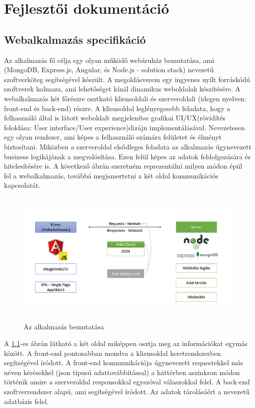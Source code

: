 \chapter{Fejlesztői dokumentáció} %
\label{ch:impl}

\section{Webalkalmazás specifikáció}
Az alkalmazás fő célja egy olyan működő webáruház bemutatása, ami \citeauthor{MEAN} (MongoDB, Express.js, Angular, és Node.js - solution stack) nevezetű szoftverköteg segítségével készült. A \citeauthor{MEAN}  megoldásverem egy ingyenes nyílt forráskódú szoftverek halmaza, ami lehetőséget kínál dinamikus weboldalak készítésére. A webalkalmazás két főrészre osztható kliensoldali és szerveroldali (idegen nyelven: front-end és back-end) részre. A kliensoldal leglényegesebb feladata, hogy a felhasználó által is látott weboldalt megjelenítse grafikai UI/UX(rövidítés feloldása: User interface/User experience)dizájn implementálásával. Nevezetesen egy olyan rendszer, ami képes a felhasználó számára felületet és élményt biztosítani. Miközben a szerveroldal elsődleges feladata az alkalmazás úgynevezett business logikájának a megvalósítása. Ezen felül képes az adatok feldolgozására és hitelesítésére is. A következő ábrán szeretném reprezentálni milyen módon épül fel a webalkalmazás, továbbá megismertetni a két oldal kommunikációs kapcsolatát.

\begin{figure}[H]
	\centering
	\includegraphics[width=1.0\textwidth,height=250px]{images/alkalmazas_bemutatasa.png}
	\caption{Az alkalmazás bemutatása}
	\label{fig.picture-1}
\end{figure}

A \ref{fig.picture-1}-es ábrán látható a két oldal miképpen osztja meg az információkat egymás között. A front-end pontosabban mondva a kliensoldal \citeauthor{Angular} keretrendszerben \citeauthor{TypeScript} segítségével íródott. A front-end kommunikációja úgynevezett requestekkel más néven kérésekkel (json típusú adattovábbítással) a háttérben aszinkron módon történik amire a szerveroldal responsokkal egyszóval válaszokkal felel. A back-end \citeauthor{Node.js} szoftverrendszer alapú, ami \citeauthor{Express} segítségével íródott. Az adatok tárolásáért a \citeauthor{MongoDB} nevezetű adatbázis felel.

